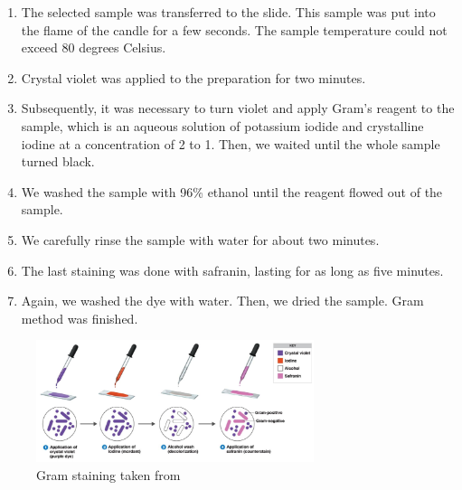 \documentclass{cfp}
\begin{document}
\begin{enumerate}
  \item The selected sample was transferred to the slide. This sample was put into the flame of the candle for a few seconds. The sample temperature could not exceed 80 degrees Celsius.
  \item Crystal violet was applied to the preparation for two minutes.
  \item Subsequently, it was necessary to turn violet and apply Gram's reagent to the sample, which is an aqueous solution of potassium iodide and crystalline iodine at a concentration of 2 to 1. Then, we waited until the whole sample turned black.
  \item We washed the sample with 96\% ethanol until the reagent flowed out of the sample.
  \item We carefully rinse the sample with water for about two minutes.
  \item The last staining was done with safranin, lasting for as long as five minutes.
  \item Again, we washed the dye with water. Then, we dried the sample. Gram method was finished.
\end{enumerate}
\begin{figure}[!h]
\centering
\caption{Gram staining taken from \cite{Labfo}}
\includegraphics[width=230pt]{Gramprocedure.png}
\end{figure}
\end{document}
